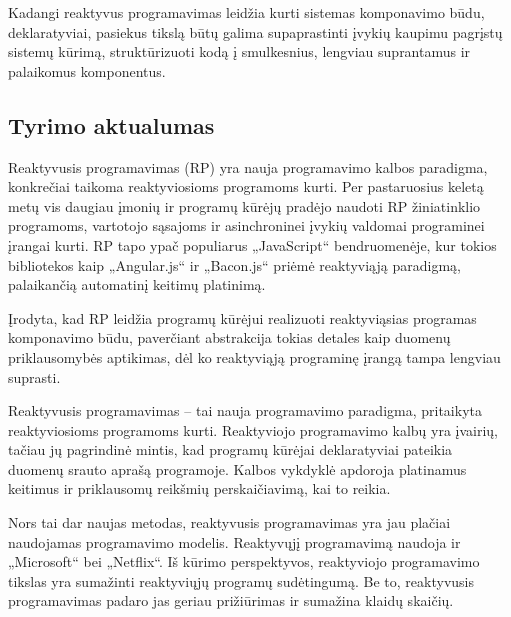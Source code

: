 Kadangi reaktyvus programavimas leidžia kurti sistemas komponavimo būdu, deklaratyviai, pasiekus tikslą būtų galima supaprastinti įvykių kaupimu pagrįstų sistemų kūrimą, struktūrizuoti kodą į smulkesnius, lengviau suprantamus ir palaikomus komponentus.


\subsection{Tyrimo aktualumas}

Reaktyvusis programavimas (RP) yra nauja programavimo kalbos paradigma, konkrečiai taikoma reaktyviosioms programoms kurti. Per pastaruosius keletą metų vis daugiau įmonių ir programų kūrėjų pradėjo naudoti RP žiniatinklio programoms, vartotojo sąsajoms ir asinchroninei įvykių valdomai programinei įrangai kurti. RP tapo ypač populiarus „JavaScript“ bendruomenėje, kur tokios bibliotekos kaip „Angular.js“ ir „Bacon.js“ priėmė reaktyviąją paradigmą, palaikančią automatinį keitimų platinimą.

Įrodyta, kad RP leidžia programų kūrėjui realizuoti reaktyviąsias programas komponavimo būdu, paverčiant abstrakcija tokias detales kaip duomenų priklausomybės aptikimas, dėl ko reaktyviąją programinę įrangą tampa lengviau suprasti.

Reaktyvusis programavimas – tai nauja programavimo paradigma, pritaikyta reaktyviosioms programoms kurti. Reaktyviojo programavimo kalbų yra įvairių, tačiau jų pagrindinė mintis, kad programų kūrėjai deklaratyviai pateikia duomenų srauto aprašą programoje. Kalbos vykdyklė apdoroja platinamus keitimus ir priklausomų reikšmių perskaičiavimą, kai to reikia.

Nors tai dar naujas metodas, reaktyvusis programavimas yra jau plačiai naudojamas programavimo modelis. Reaktyvųjį programavimą naudoja ir „Microsoft“ bei „Netflix“. Iš kūrimo perspektyvos, reaktyviojo programavimo tikslas yra sumažinti reaktyviųjų programų sudėtingumą. Be to, reaktyvusis programavimas padaro jas geriau prižiūrimas ir sumažina klaidų skaičių.

